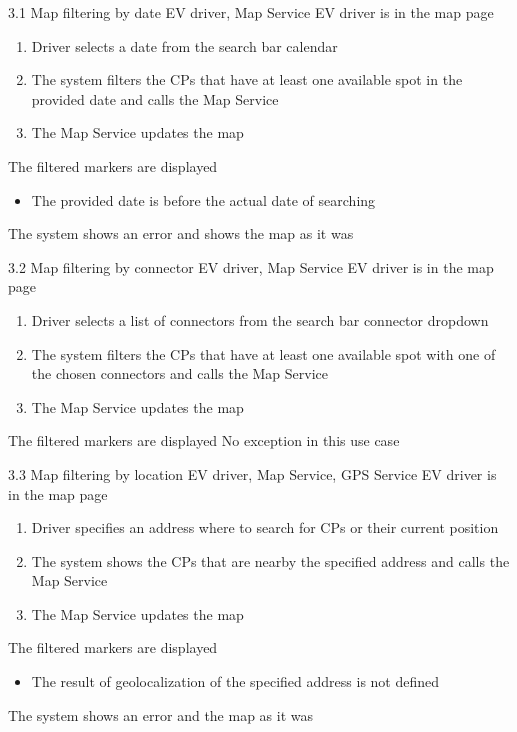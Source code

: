 \usecase
{3.1}
{Map filtering by date}
{EV driver, Map Service}
{EV driver is in the map page}
{
    \begin{enumerate}
        \item Driver selects a date from the search bar calendar
        \item The system filters the CPs that have at least one available spot in the provided date and calls the Map Service
        \item The Map Service updates the map
    \end{enumerate}
}
{The filtered markers are displayed}
{
    \begin{itemize}
        \item The provided date is before the actual date of searching
    \end{itemize}
}
{
    The system shows an error and shows the map as it was
}

\usecase
{3.2}
{Map filtering by connector}
{EV driver, Map Service}
{EV driver is in the map page}
{
    \begin{enumerate}
        \item Driver selects a list of connectors from the search bar connector dropdown
        \item The system filters the CPs that have at least one available spot with one of the chosen connectors and calls the Map Service
        \item The Map Service updates the map
    \end{enumerate}
}
{The filtered markers are displayed}
{
    No exception in this use case
}
{
}

\usecase
{3.3}
{Map filtering by location}
{EV driver, Map Service, GPS Service}
{EV driver is in the map page}
{
    \begin{enumerate}
        \item Driver specifies an address where to search for CPs or their current position
        \item The system shows the CPs that are nearby the specified address and calls the Map Service
        \item The Map Service updates the map
    \end{enumerate}
}
{The filtered markers are displayed}
{
    \begin{itemize}
        \item The result of geolocalization of the specified address is not defined
    \end{itemize}
}
{
    The system shows an error and the map as it was
}

